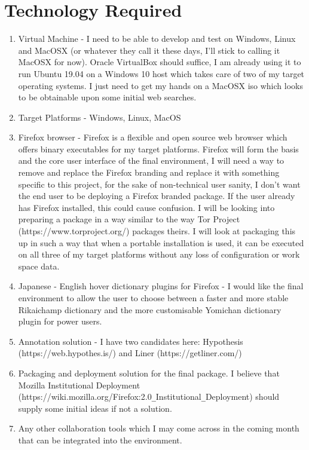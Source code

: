 \documentclass{article}
\begin{document}
\section{Technology Required}
\begin{enumerate}
    \item Virtual Machine - I need to be able to develop and test on Windows, Linux and MacOSX (or whatever they call it these days, I'll stick to calling it MacOSX for now). Oracle VirtualBox should suffice, I am already using it to run Ubuntu 19.04 on a Windows 10 host which takes care of two of my target operating systems. I just need to get my hands on a MacOSX iso which looks to be obtainable upon some initial web searches.
    \item Target Platforms - Windows, Linux, MacOS
    \item Firefox browser - Firefox is a flexible and open source web browser which offers binary executables for my target platforms. Firefox will form the basis and the core user interface of the final environment, I will need a way to remove and replace the Firefox branding and replace it with something specific to this project, for the sake of non-technical user sanity, I don't want the end user to be deploying a Firefox branded package. If the user already has Firefox installed, this could cause confusion. I will be looking into preparing a package in a way similar to the way Tor Project (https://www.torproject.org/) packages theirs. I will look at packaging this up in such a way that when a portable installation is used, it can be executed on all three of my target platforms without any loss of configuration or work space data.
    \item Japanese - English hover dictionary plugins for Firefox - I would like the final environment to allow the user to choose between a faster and more stable Rikaichamp dictionary and the more customisable Yomichan dictionary plugin for power users.
    \item Annotation solution - I have two candidates here: Hypothesis \newline (https://web.hypothes.is/) and Liner (https://getliner.com/)
    \item Packaging and deployment solution for the final package. I believe that Mozilla Institutional Deployment \newline (https://wiki.mozilla.org/Firefox:2.0\verb|_|Institutional\verb|_|Deployment) should supply some initial ideas if not a solution.
    \item Any other collaboration tools which I may come across in the coming month that can be integrated into the environment.
\end{enumerate}
\end{document}
